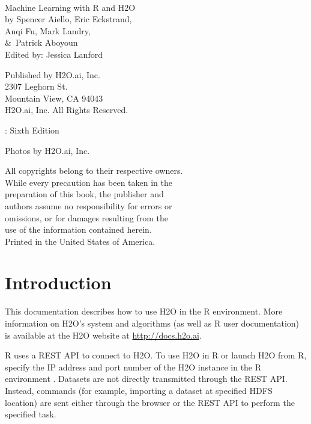 {\raggedright\vfill\ 

Machine Learning with R and H2O\\

  by Spencer Aiello, Eric Eckstrand, \\Anqi Fu, Mark Landry,  \\ \&\ Patrick Aboyoun\\
Edited by: Jessica Lanford

\bigskip
Published by H2O.ai, Inc. \\
2307 Leghorn St. \\
Mountain View, CA 94043\\
\bigskip
\textcopyright \the\year \hspace{1pt} H2O.ai, Inc. All Rights Reserved. 
\bigskip

\monthname \hspace{1pt}  \the\year: Sixth Edition
\bigskip

Photos by \textcopyright H2O.ai, Inc. 
\bigskip

All copyrights belong to their respective owners.\\
While every precaution has been taken in the\\
preparation of this book, the publisher and\\
authors assume no responsibility for errors or\\
omissions, or for damages resulting from the\\
use of the information contained herein.\\
\bigskip
Printed in the United States of America. 




\newpage
\thispagestyle{empty}%
\tableofcontents
\thispagestyle{empty}%


\newpage


\section{Introduction}

This documentation describes how to use H2O in the R environment. More information on H2O's system and algorithms (as well as R user documentation) is available at the H2O website at {\url{http://docs.h2o.ai}}. 

R uses a REST API to connect to H2O. To use H2O in R or launch H2O from R, specify the IP address and port number of the H2O instance in the R environment . Datasets are not directly transmitted through the REST API. Instead, commands (for example, importing a dataset at specified HDFS location) are sent either through the browser or the REST API to perform the specified task.

}
